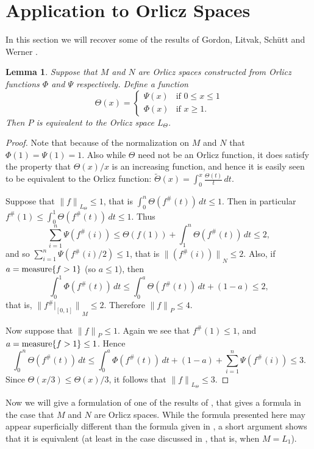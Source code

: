 \documentclass[12pt]{amsart}
\newtheorem{lemma}[thm]{Lemma}
\newcommand{\snormo}[1]{{\mathopen\|#1\mathclose\|}}
\newcommand{\measure}{\text{\rm measure}}
\begin{document}
\section{Application to Orlicz Spaces}

In this section we will recover some of the results of
Gordon, Litvak, Sch\"utt and Werner \cite{gordon et al}.

\begin{lemma}
\label{l equiv}
Suppose that $M$ and $N$ are Orlicz spaces constructed
from Orlicz functions $\Phi$ and $\Psi$ respectively.  
Define a function
\[
   \Theta(x) = \left\{
   \begin{array}{cl}
     \Psi(x) & \text{if }0\le x \le 1\\
     \Phi(x) & \text{if }x \ge 1.
   \end{array} \right.
\]
Then $P$ is equivalent to the Orlicz space $L_\Theta$.
\end{lemma}

\begin{proof}
Note that because of the normalization on $M$ and $N$ that 
$\Phi(1) = \Psi(1) = 1$.  Also while
$\Theta$ need not be an Orlicz function, 
it does satisfy the property that $\Theta(x)/x$ is an increasing 
function, and hence it is easily seen to
be equivalent
to the Orlicz function:
$\tilde\Theta(x) = \int_0^x \frac{\Theta(t)} t \, dt $.

Suppose that $\snormo f_{L_\Theta} \le 1$, that is
$\int_0^n \Theta(f^\#(t)) \, dt \le 1 $.
Then in particular $f^\#(1) \le \int_0^1 \Theta(f^\#(t)) \, dt \le 1 $.
Thus
\[
   \sum_{i=1}^n \Psi(f^\#(i)) \le \Theta(f(1)) + 
     \int_1^n \Theta(f^\#(t)) \, dt \le 2 ,
\]
and so $\sum_{i=1}^n \Psi(f^\#(i)/2) \le 1$, that is 
$\snormo{(f^\#(i))}_N \le 2$.
Also, if $a = \measure\{f>1\}$ (so $a\le 1$), then
\[
   \int_0^1 \Phi(f^\#(t)) \, dt \le
   \int_0^a \Theta(f^\#(t)) \, dt + (1-a) \le 2,
\]
that is, $\snormo{f^\#|_{[0,1]}}_M \le 2$.  Therefore $\snormo f_P \le 4$.

Now suppose that $\snormo f_P \le 1$.  Again we see that $f^\#(1) \le 1$,
and $a = \measure\{f>1\} \le 1$.  Hence
\[
   \int_0^n \Theta(f^\#(t)) \, dt \le
   \int_0^a \Phi(f^\#(t)) \, dt + (1-a) + 
   \sum_{i=1}^n \Psi(f^\#(i)) \le 3 .
\]
Since $\Theta(x/3) \le \Theta(x)/3$, it follows that
$\snormo f_{L_\Theta} \le 3$.
\end{proof}

Now we will give a formulation of one of the results of
\cite{gordon et al}, that gives a formula in the case that $M$ and
$N$ are Orlicz spaces.  While the formula presented here may appear
superficially different than the formula given in \cite{gordon et al},
a short argument shows that it is equivalent (at least in
the case discussed in \cite{gordon et al}, that is, when $M = L_1$).
\end{document}
